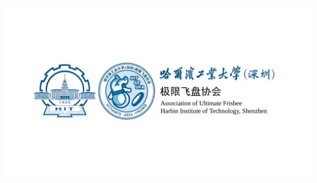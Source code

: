 \documentclass{ctexart}
\begin{document}
\begin{titlepage}
\begin{center}
        \vspace{12em} %
        \includegraphics[width=0.65\paperwidth, trim=50bp 6.4cm 50bp 6.3cm, clip]{协会旗帜.pdf}
    \end{center}

    \vfill
\end{titlepage}

\clearpage
{}
\pagestyle{plain}
\clearpage
{}
\pagestyle{fancy}
\end{document}
